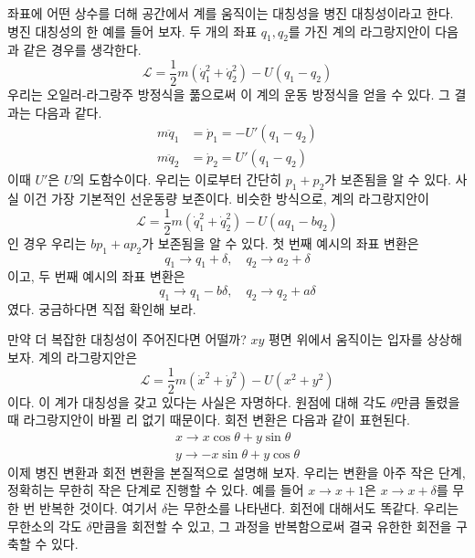 \documentclass[chapter, oneside, b5paper]{oblivoir}
\theoremstyle{plain}
\theoremstyle{definition}
\theoremstyle{remark}
\begin{document}
좌표에 어떤 상수를 더해 공간에서 계를 움직이는 대칭성을 병진 대칭성이라고 한다. 병진 대칭성의 한 예를 들어 보자. 두 개의 좌표 $q_1, q_2$를 가진 계의 라그랑지안이 다음과 같은 경우를 생각한다.
\begin{equation}
    \mathcal{L} = \frac{1}{2}m(\dot{q}_1^2 + \dot{q}_2^2) - U(q_1 - q_2)
\end{equation}
우리는 오일러-라그랑주 방정식을 풂으로써 이 계의 운동 방정식을 얻을 수 있다. 그 결과는 다음과 같다.
\begin{equation}
    \begin{aligned}
    m \ddot{q}_1 &= \dot{p}_1 = -U'(q_1 - q_2) \\
    m \ddot{q}_2 &= \dot{p}_2 = U'(q_1 - q_2) 
    \end{aligned}
\end{equation}
이때 $U'$은 $U$의 도함수이다. 우리는 이로부터 간단히 $p_1+p_2$가 보존됨을 알 수 있다. 사실 이건 가장 기본적인 선운동량 보존이다. 비슷한 방식으로, 계의 라그랑지안이
\begin{equation}
    \mathcal{L} = \frac{1}{2}m(\dot{q}_1^2 + \dot{q}_2^2) - U(aq_1 - bq_2)
\end{equation}
인 경우 우리는 $bp_1+ap_2$가 보존됨을 알 수 있다. 첫 번째 예시의 좌표 변환은
\begin{equation}
    q_1 \to q_1 + \delta, \quad q_2 \to a_2 + \delta \label{eq:6.79}
\end{equation}
이고, 두 번째 예시의 좌표 변환은
\begin{equation}
    q_1 \to q_1 - b \delta, \quad q_2 \to q_2 + a \delta \label{eq:6.80}
\end{equation}
였다. 궁금하다면 직접 확인해 보라.

만약 더 복잡한 대칭성이 주어진다면 어떨까? $xy$ 평면 위에서 움직이는 입자를 상상해 보자. 계의 라그랑지안은
\begin{equation}
    \mathcal{L} = \frac{1}{2}m(\dot{x}^2 + \dot{y}^2) - U(x^2 + y^2)
\end{equation}
이다. 이 계가 대칭성을 갖고 있다는 사실은 자명하다. 원점에 대해 각도 $\theta$만큼 돌렸을 때 라그랑지안이 바뀔 리 없기 때문이다. 회전 변환은 다음과 같이 표현된다.
\begin{equation}
    \begin{aligned}
    x \to x\cos{\theta} + y\sin{\theta} \\
    y \to -x\sin{\theta} + y\cos{\theta} 
    \end{aligned}
    \label{eq:6.82}
\end{equation}
이제 병진 변환과 회전 변환을 본질적으로 설명해 보자. 우리는 변환을 아주 작은 단계, 정확히는 무한히 작은 단계로 진행할 수 있다. 예를 들어 $x \to x+1$은 $x \to x+\delta$를 무한 번 반복한 것이다. 여기서 $\delta$는 무한소를 나타낸다. 회전에 대해서도 똑같다. 우리는 무한소의 각도 $\delta$만큼을 회전할 수 있고, 그 과정을 반복함으로써 결국 유한한 회전을 구축할 수 있다.
\end{document}
